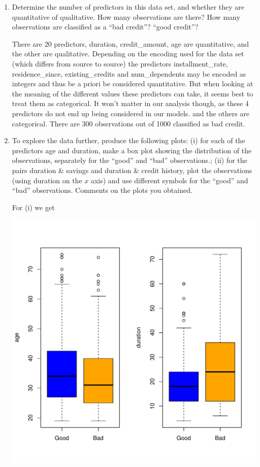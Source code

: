 \documentclass[11pt]{article}
\begin{document}
\begin{enumerate}
\item Determine the number of predictors in this data set, and whether they are quantitative of qualitative. How many observations are there? How many observations are classified as a ``bad credit''? ``good credit''?

   There are 20 predictors, duration, credit\_amount, age are quantitative, and the other are qualitative. 
  Depending on the encoding used for the data set (which differs from source to source) the predictors  installment\_rate, residence\_since, existing\_credits and num\_dependents may be encoded as integers and thus be a priori be considered quantitative. But when looking at the meaning of the different values these predictors can take, it seems best to treat them as categorical. It won't matter in our analysis though, as these 4 predictors do not end up being considered in our models. and the others are categorical. %
  There are 300 observations out of 1000 classified as bad credit.
\item To explore the data further, produce the following plots: (i) for each of the predictors age and duration, make a box plot showing the distribution of the observations, separately for the ``good'' and ``bad'' observations.; (ii) for the pairs duration \& savings and duration \& credit history, plot the observations (using duration on the $x$ axis) and use different symbols for the ``good'' and ``bad'' observations. Comments on the plots you obtained.

   For (i) we get

  \includegraphics[scale=0.6]{box1.pdf}


\end{enumerate}
\end{document}
